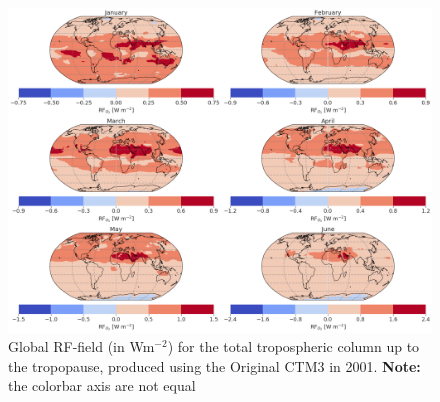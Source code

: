 \begin{figure}[ht]
    \centering
    \includegraphics[width = \linewidth]{Chapter6_Results/images/RF/RF_USE/Appendix/Orig_RF_global_2001.png}
    \caption{Global RF-field (in Wm$^{-2}$) for the total tropospheric column up to the tropopause, produced using the Original CTM3 in 2001. \textbf{Note:} the colorbar axis are not equal}
    \label{fig:orig_RF_global_2001}
\end{figure}
